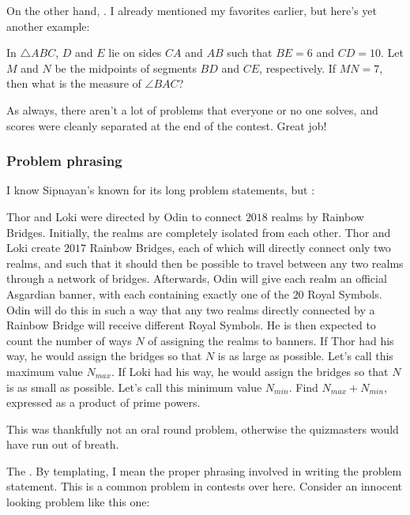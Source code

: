 \documentclass[11pt,paper=letter]{scrartcl}
\begin{document}
On the other hand, . I already mentioned my favorites earlier, but here's yet another example:

\begin{probboxed}
   In $\triangle ABC$, $D$ and $E$ lie on sides $CA$ and $AB$ such that $BE = 6$ and $CD = 10$. Let $M$ and $N$ be the midpoints of segments $BD$ and $CE$, respectively. If $MN = 7$, then what is the measure of $\angle BAC$?
\end{probboxed}

As always,  there aren't a lot of problems that everyone or no one solves, and scores were cleanly separated at the end of the contest. Great job!

\subsubsection*{Problem phrasing}

I know Sipnayan's known for its long problem statements, but :

\begin{probboxed}
   Thor and Loki were directed by Odin to connect $2018$ realms by Rainbow Bridges. Initially, the realms are completely isolated from each other. Thor and Loki create $2017$ Rainbow Bridges, each of which will directly connect only two realms, and such that it should then be possible to travel between any two realms through a network of bridges. Afterwards, Odin will give each realm an official Asgardian banner, with each containing exactly one of the $20$ Royal Symbols. Odin will do this in such a way that any two realms directly connected by a Rainbow Bridge will receive different Royal Symbols. He is then expected to count the number of ways $N$ of assigning the realms to banners. If Thor had his way, he would assign the bridges so that $N$ is as large as possible. Let's call this maximum value $N_{max}$. If Loki had his way, he would assign the bridges so that $N$ is as small as possible. Let's call this minimum value $N_{min}$. Find $N_{max} + N_{min}$, expressed as a product of prime powers.
\end{probboxed}

This was thankfully not an oral round problem, otherwise the quizmasters would have run out of breath. 

The . By templating, I mean the proper phrasing involved in writing the problem statement. This is a common problem in contests over here. Consider an innocent looking problem like this one:
\end{document}
